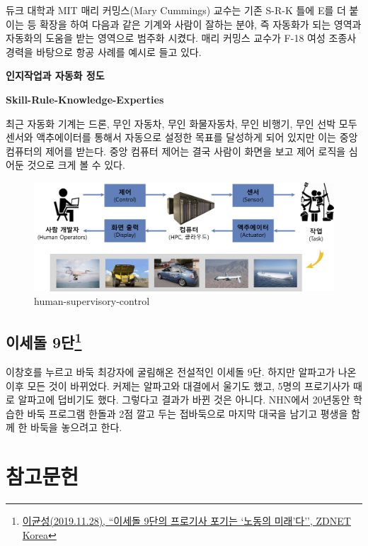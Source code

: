 \documentclass[smallextended]{svjour3}       %
\begin{document}
듀크 대학과 MIT 매리 커밍스(Mary Cummings) 교수는 기존 S-R-K 틀에 E를 더
붙이는 등 확장을 하여 다음과 같은 기계와 사람이 잘하는 분야, 즉 자동화가
되는 영역과 자동화의 도움을 받는 영역으로 범주화 시켰다. 매리 커밍스
교수가 F-18 여성 조종사 경력을 바탕으로 항공 사례를 예시로 들고 있다.

\textbf{인지작업과 자동화 정도}

\textbf{Skill-Rule-Knowledge-Experties}

최근 자동화 기계는 드론, 무인 자동차, 무인 화물자동차, 무인 비행기, 무인
선박 모두 센서와 액추에이터를 통해서 자동으로 설정한 목표를 달성하게
되어 있지만 이는 중앙 컴퓨터의 제어를 받는다. 중앙 컴퓨터 제어는 결국
사람이 화면을 보고 제어 로직을 심어둔 것으로 크게 볼 수 있다.

\begin{figure}
\hypertarget{id}{%
\centering
\includegraphics[width=1\textwidth,height=\textheight]{fig/human-supervisory-control.png}
\caption{human-supervisory-control}\label{id}
}
\end{figure}

\hypertarget{play-go}{%
\subsection[이세돌 9단]{\texorpdfstring{이세돌
9단\footnote{\href{https://n.news.naver.com/article/092/0002175655}{이균성(2019.11.28),
  ``이세돌 9단의 프로기사 포기는 `노동의 미래'다'', ZDNET Korea}}}{이세돌 9단}}\label{play-go}}

이창호를 누르고 바둑 최강자에 굴림해온 전설적인 이세돌 9단. 하지만
알파고가 나온 이후 모든 것이 바뀌었다. 커제는 알파고와 대결에서 울기도
했고, 5명의 프로기사가 때로 알파고에 덥비기도 했다. 그렇다고 결과가 바뀐
것은 아니다. NHN에서 20년동안 학습한 바둑 프로그램 한돌과 2점 깔고 두는
접바둑으로 마지막 대국을 남기고 평생을 함께 한 바둑을 놓으려고 한다.

\hypertarget{uxcc38uxace0uxbb38uxd5cc}{%
\section{참고문헌}\label{uxcc38uxace0uxbb38uxd5cc}}
\end{document}
